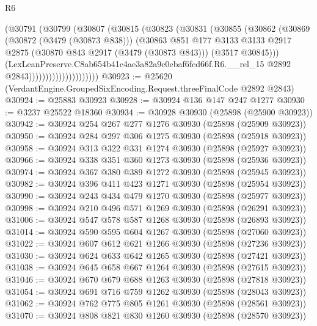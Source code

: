 \begin{lexlean}{R6}
\begin{coremodule}
                            (@30791
                              (@30799
                                (@30807
                                  (@30815
                                    (@30823
                                      (@30831
                                        (@30855
                                          (@30862
                                            (@30869
                                              (@30872 (@3479 (@30873 @838)))
                                              (@30863
                                                @851
                                                @177
                                                @3133
                                                @3133
                                                @2917
                                                @2875
                                                (@30870 @843 @2917 (@3479 (@30873 @843)))
                                                (@3517 @30845)))
                                            (LexLeanPreserve.C8ab654b41c4ae3a82a9c0ebaf6fcd66f.R6.__rel_15
                                              @2892
                                              @2843)))))))))))))))))))))
@30923 := @25620 (VerdantEngine.GroupedSixEncoding.Request.threeFinalCode @2892 @2843)
@30924 := @25883 @30923
@30928 := @30924 @136 @147 @247 @1277
@30930 := @3237 @25522 @18360
@30934 := @30928 @30930 (@25898 (@25900 @30923))
@30942 := @30924 @254 @267 @277 @1276 @30930 (@25898 (@25909 @30923))
@30950 := @30924 @284 @297 @306 @1275 @30930 (@25898 (@25918 @30923))
@30958 := @30924 @313 @322 @331 @1274 @30930 (@25898 (@25927 @30923))
@30966 := @30924 @338 @351 @360 @1273 @30930 (@25898 (@25936 @30923))
@30974 := @30924 @367 @380 @389 @1272 @30930 (@25898 (@25945 @30923))
@30982 := @30924 @396 @411 @423 @1271 @30930 (@25898 (@25954 @30923))
@30990 := @30924 @243 @434 @479 @1270 @30930 (@25898 (@25977 @30923))
@30998 := @30924 @210 @496 @571 @1269 @30930 (@25898 (@26291 @30923))
@31006 := @30924 @547 @578 @587 @1268 @30930 (@25898 (@26893 @30923))
@31014 := @30924 @590 @595 @604 @1267 @30930 (@25898 (@27060 @30923))
@31022 := @30924 @607 @612 @621 @1266 @30930 (@25898 (@27236 @30923))
@31030 := @30924 @624 @633 @642 @1265 @30930 (@25898 (@27421 @30923))
@31038 := @30924 @645 @658 @667 @1264 @30930 (@25898 (@27615 @30923))
@31046 := @30924 @670 @679 @688 @1263 @30930 (@25898 (@27818 @30923))
@31054 := @30924 @691 @716 @759 @1262 @30930 (@25898 (@28043 @30923))
@31062 := @30924 @762 @775 @805 @1261 @30930 (@25898 (@28561 @30923))
@31070 := @30924 @808 @821 @830 @1260 @30930 (@25898 (@28570 @30923))

\end{coremodule}
\end{lexlean}
